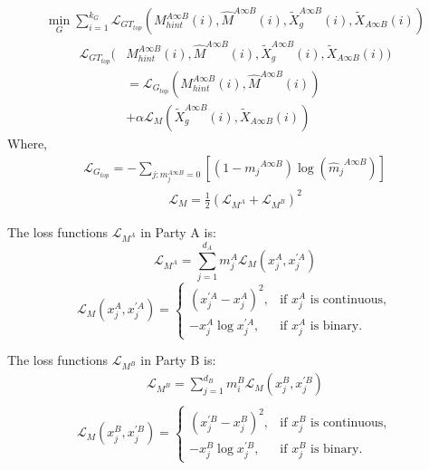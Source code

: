 \documentclass[final,1p,times]{elsarticle}
\begin{document}
\begin{equation}
	\begin{split}
		\min_{G}\sum_{i=1}^{k_{G}}\mathcal{L}_{GT_{top}}(M_{hint}^{A\infty B}(i),\hat{M}^{A\infty B}(i),\tilde{X}_{g}^{A\infty B}(i),\tilde{X}_{A\infty B}(i))
	\end{split}
\end{equation}
\begin{equation}
	\begin{split}
		\mathcal{L}_{GT_{top}}(&M_{hint}^{A\infty B}(i),\hat{M}^{A\infty B}(i),\tilde{X}_{g}^{A\infty B}(i),\tilde{X}_{A\infty B}(i))\\
		&=\mathcal{L}_{G_{top}}(M_{hint}^{A\infty B}(i),\hat{M}^{A\infty B}(i))\\
		&+\alpha\mathcal{L}_{M}(\tilde{X}_{g}^{A\infty B}(i),\tilde{X}_{A\infty B}(i))
	\end{split}
\end{equation}
Where,
\begin{equation}
	\begin{split}
		\mathcal{L}_{G_{top}}=-\sum_{j:m_{j}^{A\infty B}=0}[(1-{m_{j}}^{A\infty B})\log({\hat{m}_{j}}^{A\infty B})]_{}
	\end{split}
\end{equation}
\begin{equation}
	\begin{split}
		\mathcal{L}_M=\frac{1}{2}(\mathcal{L}_{M^A}+\mathcal{L}_{M^B})^2
	\end{split}
\end{equation}

The loss functions $\mathcal{L}_{M^{A}}$ in Party A is:
\begin{equation}
	\mathcal{L}_{M^A}=\sum_{j=1}^{d_A}m_j^A\mathcal{L}_M(x_j^A,x_j^{\prime A})		
\end{equation}
$$\mathcal{L}_M(x_j^A, x_j^{\prime A}) = 
\begin{cases} 
	(x_j^{\prime A} - x_j^A)^2, & \text{if } x_j^A \text{ is continuous}, \\
	-x_j^A \log x_j^{\prime A},  & \text{if } x_j^A \text{ is binary}.
\end{cases}
$$

The loss functions $\mathcal{L}_{M^{B}}$ in Party B is:
\begin{equation}
	\begin{split}
		\mathcal{L}_{M^B}=\sum_{j=1}^{d_B}m_i^B\mathcal{L}_M(x_j^B,x_j^{\prime B})\\
	\end{split}
\end{equation}
\[
	\mathcal{L}_M(x_j^B, x_j^{\prime B}) = 
\begin{cases} 
	(x_j^{\prime B} - x_j^B)^2, & \text{if } x_j^B \text{ is continuous}, \\
	-x_j^B \log x_j^{\prime B},  & \text{if } x_j^B \text{ is binary}.
\end{cases}
\]
\end{document}
